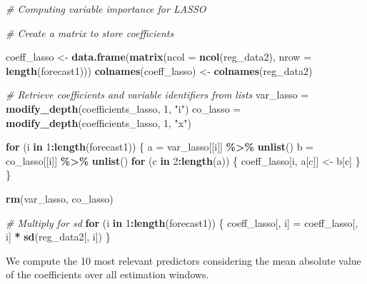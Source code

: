 \documentclass[
]{article}
\newenvironment{Shaded}{\begin{snugshade}}{\end{snugshade}}
\newcommand{\AttributeTok}[1]{\textcolor[rgb]{0.13,0.29,0.53}{#1}}
\newcommand{\CommentTok}[1]{\textcolor[rgb]{0.56,0.35,0.01}{\textit{#1}}}
\newcommand{\ControlFlowTok}[1]{\textcolor[rgb]{0.13,0.29,0.53}{\textbf{#1}}}
\newcommand{\DecValTok}[1]{\textcolor[rgb]{0.00,0.00,0.81}{#1}}
\newcommand{\FunctionTok}[1]{\textcolor[rgb]{0.13,0.29,0.53}{\textbf{#1}}}
\newcommand{\NormalTok}[1]{#1}
\newcommand{\OtherTok}[1]{\textcolor[rgb]{0.56,0.35,0.01}{#1}}
\newcommand{\SpecialCharTok}[1]{\textcolor[rgb]{0.81,0.36,0.00}{\textbf{#1}}}
\newcommand{\StringTok}[1]{\textcolor[rgb]{0.31,0.60,0.02}{#1}}
\begin{document}
\begin{Shaded}
\begin{Highlighting}[]
\CommentTok{\# Computing variable importance for LASSO}

\CommentTok{\# Create a matrix to store coefficients}

\NormalTok{coeff\_lasso }\OtherTok{\textless{}{-}} \FunctionTok{data.frame}\NormalTok{(}\FunctionTok{matrix}\NormalTok{(}\AttributeTok{ncol =} \FunctionTok{ncol}\NormalTok{(reg\_data2), }\AttributeTok{nrow =} \FunctionTok{length}\NormalTok{(forecast1)))}
\FunctionTok{colnames}\NormalTok{(coeff\_lasso) }\OtherTok{\textless{}{-}} \FunctionTok{colnames}\NormalTok{(reg\_data2)}

\CommentTok{\# Retrieve coefficients and variable identifiers from lists}
\NormalTok{var\_lasso }\OtherTok{=} \FunctionTok{modify\_depth}\NormalTok{(coefficients\_lasso, }\DecValTok{1}\NormalTok{, }\StringTok{"i"}\NormalTok{)}
\NormalTok{co\_lasso }\OtherTok{=} \FunctionTok{modify\_depth}\NormalTok{(coefficients\_lasso, }\DecValTok{1}\NormalTok{, }\StringTok{"x"}\NormalTok{)}

\ControlFlowTok{for}\NormalTok{ (i }\ControlFlowTok{in} \DecValTok{1}\SpecialCharTok{:}\FunctionTok{length}\NormalTok{(forecast1)) \{}
\NormalTok{    a }\OtherTok{=}\NormalTok{ var\_lasso[[i]] }\SpecialCharTok{\%\textgreater{}\%}
        \FunctionTok{unlist}\NormalTok{()}
\NormalTok{    b }\OtherTok{=}\NormalTok{ co\_lasso[[i]] }\SpecialCharTok{\%\textgreater{}\%}
        \FunctionTok{unlist}\NormalTok{()}
    \ControlFlowTok{for}\NormalTok{ (c }\ControlFlowTok{in} \DecValTok{2}\SpecialCharTok{:}\FunctionTok{length}\NormalTok{(a)) \{}
\NormalTok{        coeff\_lasso[i, a[c]] }\OtherTok{\textless{}{-}}\NormalTok{ b[c]}
\NormalTok{    \}}
\NormalTok{\}}

\FunctionTok{rm}\NormalTok{(var\_lasso, co\_lasso)}

\CommentTok{\# Multiply for sd}
\ControlFlowTok{for}\NormalTok{ (i }\ControlFlowTok{in} \DecValTok{1}\SpecialCharTok{:}\FunctionTok{length}\NormalTok{(forecast1)) \{}
\NormalTok{    coeff\_lasso[, i] }\OtherTok{=}\NormalTok{ coeff\_lasso[, i] }\SpecialCharTok{*} \FunctionTok{sd}\NormalTok{(reg\_data2[, i])}
\NormalTok{\}}
\end{Highlighting}
\end{Shaded}

We compute the 10 most relevant predictors considering the mean absolute
value of the coefficients over all estimation windows.
\end{document}
